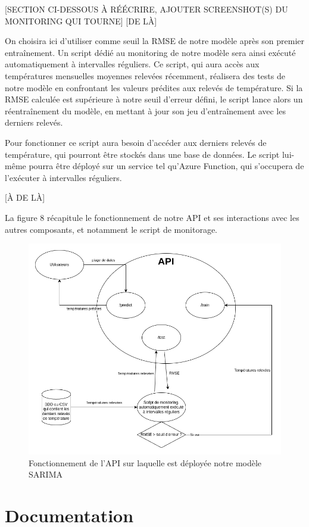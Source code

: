 \documentclass[french]{article}
\begin{document}
    [SECTION CI-DESSOUS À RÉÉCRIRE, AJOUTER SCREENSHOT(S) DU MONITORING QUI TOURNE]
    [DE LÀ]
    
    On choisira ici d'utiliser comme seuil la RMSE de notre modèle après son premier entraînement. Un script dédié au monitoring de notre modèle sera ainsi exécuté automatiquement à intervalles réguliers. Ce script, qui aura accès aux températures mensuelles moyennes relevées récemment, réalisera des tests de notre modèle en confrontant les valeurs prédites aux relevés de température. Si la RMSE calculée est supérieure à notre seuil d'erreur défini, le script lance alors un réentraînement du modèle, en mettant à jour son jeu d'entraînement avec les derniers relevés.
    
    Pour fonctionner ce script aura besoin d'accéder aux derniers relevés de température, qui pourront être stockés dans une base de données. Le script lui-même pourra être déployé sur un service tel qu'Azure Function, qui s'occupera de l'exécuter à intervalles réguliers.

    [À DE LÀ]

    La figure 8 récapitule le fonctionnement de notre API et ses interactions avec les autres composants, et notamment le script de monitorage.
    \begin{figure}[h]
        \includegraphics[width=12cm]{schema_API_E2}
        \centering
        \caption{Fonctionnement de l'API sur laquelle est déployée notre modèle SARIMA}
        \centering
    \end{figure}

    \section{Documentation}
\end{document}
